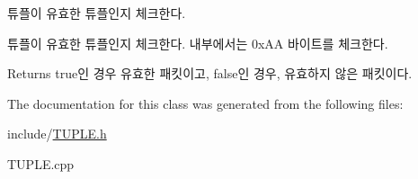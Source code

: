 튜플이 유효한 튜플인지 체크한다. 

튜플이 유효한 튜플인지 체크한다. 내부에서는 0x\+A\+A 바이트를 체크한다. \begin{DoxyReturn}{Returns}
true인 경우 유효한 패킷이고, false인 경우, 유효하지 않은 패킷이다. 
\end{DoxyReturn}


The documentation for this class was generated from the following files\+:\begin{DoxyCompactItemize}
\item 
include/\hyperlink{TUPLE_8h}{T\+U\+P\+L\+E.\+h}\item 
T\+U\+P\+L\+E.\+cpp\end{DoxyCompactItemize}
